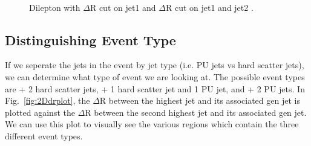 \begin{figure}[!hbtp]
\centering
{}
\\
\caption{Dilepton \pt with $\Delta$R cut on jet1  and $\Delta$R cut on jet1 and jet2 .}
\label{fig:dileppt}
\end{figure}


\subsection{Distinguishing Event Type}
If we seperate the jets in the event by jet type (i.e. PU jets vs hard scatter jets), we can determine what type of event we are looking at. The possible event types are \z + 2 hard scatter jets, \z + 1 hard scatter jet and 1 PU jet, and \z + 2 PU jets. 
In Fig.~\ref{fig:2Ddrplot}, the $\Delta$R between the highest \pt jet and its associated gen jet is plotted against the $\Delta$R between the second highest \pt jet and its associated gen jet. We can use this plot to visually see the various regions which contain the three different event types.

